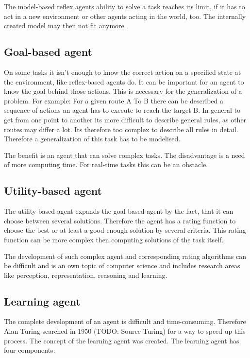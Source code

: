 \documentclass[10pt,a4paper,DIV=11]{scrreprt}
\begin{document}
The model-based reflex agents ability to solve a task reaches its limit, if it has to act in a new environment or other agents acting in the world, too. The internally created model may then not fit anymore.


\subsection{Goal-based agent}
On some tasks it isn't enough to know the correct action on a specified state at the environment, like reflex-based agents do. It can be important for an agent to know the goal behind those actions. This is necessary for the generalization of a problem. For example: For a given route A To B there can be described a sequence of actions an agent has to execute to reach the target B. In general to get from one point to another its more difficult to describe general rules, as other routes may differ a lot. Its therefore too complex to describe all rules in detail. Therefore a generalization of this task has to be modelised.

The benefit is an agent that can solve complex tasks. The disadvantage is a need of more computing time. For real-time tasks this can be an obstacle.

\subsection{Utility-based agent}
The utility-based agent expands the goal-based agent by the fact, that it can choose between several solutions. Therefore the agent has a rating function to choose the best or at least a good enough solution by several criteria. This rating function can be more complex then computing solutions of the task itself.

The development of such complex agent and corresponding rating algorithms can be difficult and is an own topic of computer science and includes research areas like perception, representation, reasoning and learning.


\subsection{Learning agent}
The complete development of an agent is difficult and time-consuming. Therefore Alan Turing searched in 1950 (TODO: Source Turing) for a way to speed up this process. The concept of the learning agent was created. The learning agent has four components: \\
\end{document}
